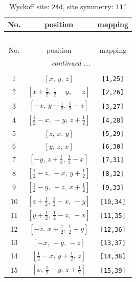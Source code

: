 \documentclass[fleqn,8pt]{jsarticle}
\begin{document}
\begin{longtable}{ccc}
\caption{Wyckoff site: {\tt 24d}, site symmetry: {\tt 11'}}
 \\
 \hline \hline
No. & position & mapping \\ \hline \endfirsthead

\multicolumn{2}{l}{\tablename\ \thetable{}} \\
 \hline \hline
No. & position & mapping \\ \hline \endhead

 \hline \hline
\multicolumn{2}{r}{\footnotesize\it continued ...} \\ \endfoot

 \hline \hline
\multicolumn{2}{r}{} \\ \endlastfoot

1 & $\left[ x,\, y,\, z \right]$ & {\tt [1,25]} \\ \hline
2 & $\left[ x + \frac{1}{2},\, \frac{1}{2} - y,\, - z \right]$ & {\tt [2,26]} \\ \hline
3 & $\left[ - x,\, y + \frac{1}{2},\, \frac{1}{2} - z \right]$ & {\tt [3,27]} \\ \hline
4 & $\left[ \frac{1}{2} - x,\, - y,\, z + \frac{1}{2} \right]$ & {\tt [4,28]} \\ \hline
5 & $\left[ z,\, x,\, y \right]$ & {\tt [5,29]} \\ \hline
6 & $\left[ y,\, z,\, x \right]$ & {\tt [6,30]} \\ \hline
7 & $\left[ - y,\, z + \frac{1}{2},\, \frac{1}{2} - x \right]$ & {\tt [7,31]} \\ \hline
8 & $\left[ \frac{1}{2} - z,\, - x,\, y + \frac{1}{2} \right]$ & {\tt [8,32]} \\ \hline
9 & $\left[ \frac{1}{2} - y,\, - z,\, x + \frac{1}{2} \right]$ & {\tt [9,33]} \\ \hline
10 & $\left[ z + \frac{1}{2},\, \frac{1}{2} - x,\, - y \right]$ & {\tt [10,34]} \\ \hline
11 & $\left[ y + \frac{1}{2},\, \frac{1}{2} - z,\, - x \right]$ & {\tt [11,35]} \\ \hline
12 & $\left[ - z,\, x + \frac{1}{2},\, \frac{1}{2} - y \right]$ & {\tt [12,36]} \\ \hline
13 & $\left[ - x,\, - y,\, - z \right]$ & {\tt [13,37]} \\ \hline
14 & $\left[ \frac{1}{2} - x,\, y + \frac{1}{2},\, z \right]$ & {\tt [14,38]} \\ \hline
15 & $\left[ x,\, \frac{1}{2} - y,\, z + \frac{1}{2} \right]$ & {\tt [15,39]} \\ \hline

\end{longtable}
\end{document}
